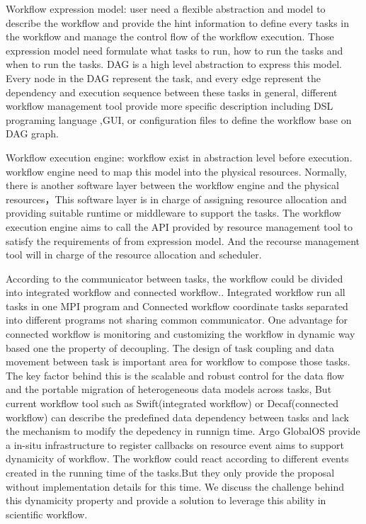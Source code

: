 \documentclass[10pt, conference, compsocconf]{IEEEtran}
\begin{document}
Workflow expression model: user need a flexible abstraction and model to describe the workflow and provide the hint information to define every tasks in the workflow and manage the control flow of the workflow execution. Those expression model need formulate what tasks to run, how to run the tasks and when to run the tasks. DAG is a high level abstraction to express this model. Every node in the DAG represent the task, and every edge represent the dependency and execution sequence between these tasks in general, different workflow management tool provide more specific description including DSL programing language ,GUI, or configuration files to define the workflow base on DAG graph.

Workflow execution engine: workflow exist in abstraction level before execution. workflow engine need to map this model into the physical resources. Normally, there is another software layer between the workflow engine and the physical resources，This software layer is in charge of assigning resource allocation and providing suitable runtime or middleware to support the tasks. The workflow execution engine aims to call the API provided by resource management tool to satisfy the requirements of from expression model. And the recourse management tool will in charge of the resource allocation and scheduler.

According to the communicator between tasks, the workflow could be divided into integrated workflow and connected workflow.\cite{dreher2017situ}. Integrated workflow run all tasks in one MPI program and Connected workflow coordinate tasks separated into different programs not sharing common communicator. One advantage for connected workflow is monitoring and customizing the workflow in dynamic way based one the property of decoupling. The design of task coupling and data movement between task is important area for workflow to compose those tasks. The key factor behind this is the scalable and robust control for the data flow and the portable migration of heterogeneous data models across tasks\cite{deelman2018future}, But current workflow tool such as Swift(integrated workflow) or Decaf(connected workflow) can describe the predefined data dependency between tasks and lack the mechanism to modify the depedency in runnign time. Argo GlobalOS \cite{perarnau2015distributed}\cite{dreher2017situ} provide a in-situ infrastructure to register callbacks on resource event aims to support dynamicity of workflow. The workflow could react according to different events created in the running time of the tasks.But they only provide the proposal without implementation details for this time. We discuss the challenge behind this dynamicity property and provide a solution to leverage this ability in scientific workflow.
\end{document}
